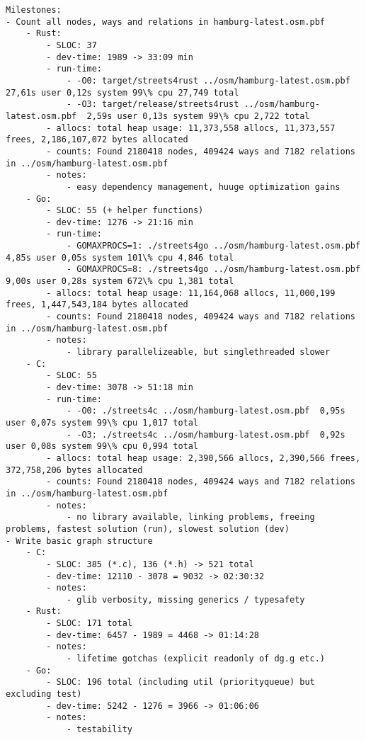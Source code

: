 \begin{verbatim}
Milestones:
- Count all nodes, ways and relations in hamburg-latest.osm.pbf
    - Rust:
        - SLOC: 37
        - dev-time: 1989 -> 33:09 min
        - run-time:
            - -O0: target/streets4rust ../osm/hamburg-latest.osm.pbf  27,61s user 0,12s system 99\% cpu 27,749 total
            - -O3: target/release/streets4rust ../osm/hamburg-latest.osm.pbf  2,59s user 0,13s system 99\% cpu 2,722 total
        - allocs: total heap usage: 11,373,558 allocs, 11,373,557 frees, 2,186,107,072 bytes allocated
        - counts: Found 2180418 nodes, 409424 ways and 7182 relations in ../osm/hamburg-latest.osm.pbf
        - notes:
            - easy dependency management, huuge optimization gains
    - Go:
        - SLOC: 55 (+ helper functions)
        - dev-time: 1276 -> 21:16 min
        - run-time:
            - GOMAXPROCS=1: ./streets4go ../osm/hamburg-latest.osm.pbf  4,85s user 0,05s system 101\% cpu 4,846 total
            - GOMAXPROCS=8: ./streets4go ../osm/hamburg-latest.osm.pbf  9,00s user 0,28s system 672\% cpu 1,381 total
        - allocs: total heap usage: 11,164,068 allocs, 11,000,199 frees, 1,447,543,184 bytes allocated
        - counts: Found 2180418 nodes, 409424 ways and 7182 relations in ../osm/hamburg-latest.osm.pbf
        - notes:
            - library parallelizeable, but singlethreaded slower
    - C:
        - SLOC: 55
        - dev-time: 3078 -> 51:18 min
        - run-time:
            - -O0: ./streets4c ../osm/hamburg-latest.osm.pbf  0,95s user 0,07s system 99\% cpu 1,017 total
            - -O3: ./streets4c ../osm/hamburg-latest.osm.pbf  0,92s user 0,08s system 99\% cpu 0,994 total
        - allocs: total heap usage: 2,390,566 allocs, 2,390,566 frees, 372,758,206 bytes allocated
        - counts: Found 2180418 nodes, 409424 ways and 7182 relations in ../osm/hamburg-latest.osm.pbf
        - notes:
            - no library available, linking problems, freeing problems, fastest solution (run), slowest solution (dev)
- Write basic graph structure
    - C:
        - SLOC: 385 (*.c), 136 (*.h) -> 521 total
        - dev-time: 12110 - 3078 = 9032 -> 02:30:32
        - notes:
            - glib verbosity, missing generics / typesafety
    - Rust:
        - SLOC: 171 total
        - dev-time: 6457 - 1989 = 4468 -> 01:14:28
        - notes:
            - lifetime gotchas (explicit readonly of dg.g etc.)
    - Go:
        - SLOC: 196 total (including util (priorityqueue) but excluding test)
        - dev-time: 5242 - 1276 = 3966 -> 01:06:06
        - notes:
            - testability
\end{verbatim}
